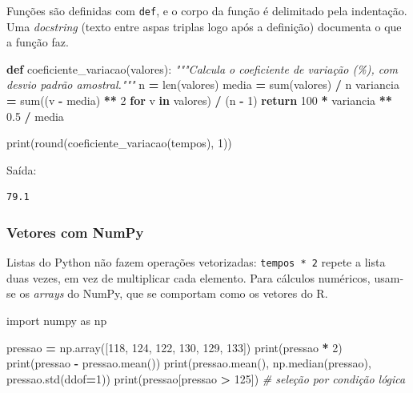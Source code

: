 \documentclass[
]{book}
\newenvironment{Shaded}{\begin{snugshade}}{\end{snugshade}}
\newcommand{\BuiltInTok}[1]{#1}
\newcommand{\CommentTok}[1]{\textcolor[rgb]{0.56,0.35,0.01}{\textit{#1}}}
\newcommand{\ControlFlowTok}[1]{\textcolor[rgb]{0.13,0.29,0.53}{\textbf{#1}}}
\newcommand{\DecValTok}[1]{\textcolor[rgb]{0.00,0.00,0.81}{#1}}
\newcommand{\FloatTok}[1]{\textcolor[rgb]{0.00,0.00,0.81}{#1}}
\newcommand{\ImportTok}[1]{#1}
\newcommand{\KeywordTok}[1]{\textcolor[rgb]{0.13,0.29,0.53}{\textbf{#1}}}
\newcommand{\NormalTok}[1]{#1}
\newcommand{\OperatorTok}[1]{\textcolor[rgb]{0.81,0.36,0.00}{\textbf{#1}}}
\begin{document}
Funções são definidas com \texttt{def}, e o corpo da função é delimitado pela indentação. Uma \emph{docstring} (texto entre aspas triplas logo após a definição) documenta o que a função faz.

\begin{Shaded}
\begin{Highlighting}[]
\KeywordTok{def}\NormalTok{ coeficiente\_variacao(valores):}
    \CommentTok{"""Calcula o coeficiente de variação (\%), com desvio padrão amostral."""}
\NormalTok{    n }\OperatorTok{=} \BuiltInTok{len}\NormalTok{(valores)}
\NormalTok{    media }\OperatorTok{=} \BuiltInTok{sum}\NormalTok{(valores) }\OperatorTok{/}\NormalTok{ n}
\NormalTok{    variancia }\OperatorTok{=} \BuiltInTok{sum}\NormalTok{((v }\OperatorTok{{-}}\NormalTok{ media) }\OperatorTok{**} \DecValTok{2} \ControlFlowTok{for}\NormalTok{ v }\KeywordTok{in}\NormalTok{ valores) }\OperatorTok{/}\NormalTok{ (n }\OperatorTok{{-}} \DecValTok{1}\NormalTok{)}
    \ControlFlowTok{return} \DecValTok{100} \OperatorTok{*}\NormalTok{ variancia }\OperatorTok{**} \FloatTok{0.5} \OperatorTok{/}\NormalTok{ media}

\BuiltInTok{print}\NormalTok{(}\BuiltInTok{round}\NormalTok{(coeficiente\_variacao(tempos), }\DecValTok{1}\NormalTok{))}
\end{Highlighting}
\end{Shaded}

Saída:

\begin{verbatim}
79.1
\end{verbatim}

\subsubsection{Vetores com NumPy}\label{vetores-com-numpy}

Listas do Python não fazem operações vetorizadas: \texttt{tempos\ *\ 2} repete a lista duas vezes, em vez de multiplicar cada elemento. Para cálculos numéricos, usam-se os \emph{arrays} do NumPy, que se comportam como os vetores do R.

\begin{Shaded}
\begin{Highlighting}[]
\ImportTok{import}\NormalTok{ numpy }\ImportTok{as}\NormalTok{ np}

\NormalTok{pressao }\OperatorTok{=}\NormalTok{ np.array([}\DecValTok{118}\NormalTok{, }\DecValTok{124}\NormalTok{, }\DecValTok{122}\NormalTok{, }\DecValTok{130}\NormalTok{, }\DecValTok{129}\NormalTok{, }\DecValTok{133}\NormalTok{])}
\BuiltInTok{print}\NormalTok{(pressao }\OperatorTok{*} \DecValTok{2}\NormalTok{)}
\BuiltInTok{print}\NormalTok{(pressao }\OperatorTok{{-}}\NormalTok{ pressao.mean())}
\BuiltInTok{print}\NormalTok{(pressao.mean(), np.median(pressao), pressao.std(ddof}\OperatorTok{=}\DecValTok{1}\NormalTok{))}
\BuiltInTok{print}\NormalTok{(pressao[pressao }\OperatorTok{\textgreater{}} \DecValTok{125}\NormalTok{])     }\CommentTok{\# seleção por condição lógica}
\end{Highlighting}
\end{Shaded}
\end{document}
